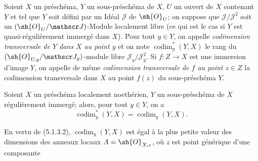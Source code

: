 \begin{definition}[19.1.3]
Soient $X$ un préschéma, $Y$ un sous-préschéma de $X$, $U$ un ouvert de $X$ contenant $Y$ et tel que $Y$ soit défini par un Idéal $\mathscr J$ de $\sh{O}_U$; on suppose que $\mathscr J/\mathscr J^2$ soit un $(\sh{O}_U/\mathscr J)$-Module localement libre (ce qui est le cas si $Y$ est quasi-régulièrement immergé dans $X$). Pour tout $y\in Y$, on appelle \emph{codimension transversale de $Y$ dans $X$ au point $y$} et on note $\operatorname{codim}_y^*(Y,X)$ le rang du $(\sh{O}_{U,y}/\mathscr J_y)$-module libre $\mathscr J_y/\mathscr J_y^2$. Si $f:Z\to X$ est une immersion d'image $Y$, on appelle de même \emph{codimension transversale de $f$ au point $z\in Z$} la codimension transversale dans $X$ au point $f(z)$ du sous-préschéma $Y$.
\end{definition}

\begin{proposition}[19.1.4]
\label{IV.19.1.4}
Soient $X$ un préschéma localement noethérien, $Y$ un sous-préschéma de $X$ régulièrement immergé; alors, pour tout $y\in Y$, on a
\begin{equation}
  \operatorname{codim}_y^*(Y,X)=\operatorname{codim}_y(Y,X).
  \tag{19.1.4.1}\label{IV.19.1.4.1}
\end{equation}
\end{proposition}

En vertu de (5.1.3.2), $\operatorname{codim}_y(Y,X)$ est égal à la plus petite valeur des dimensions des anneaux locaux $A=\sh{O}_{X,z}$, où $z$ est point générique d'une composante

